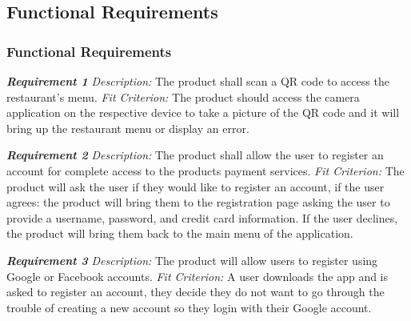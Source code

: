 \documentclass[12pt, titlepage]{article}
\begin{document}
\subsection{Functional Requirements}
\subsubsection{Functional Requirements}

\textbf{\textit{Requirement 1}}\newline
\textit{Description:}\newline
The product shall scan a QR code to access the restaurant's menu.\newline\newline
\textit{Fit Criterion:}\newline 
The product should access the camera application on the respective device to take a picture of the QR code and it will bring up the restaurant menu or display an error.
\newline

\noindent\textbf{\textit{Requirement 2}}\newline
\textit{Description:}\newline
The product shall allow the user to register an account for complete access to the products payment services. \newline\newline
\textit{Fit Criterion:}\newline 
The product will ask the user if they would like to register an account, if the user agrees: the product will bring them to the registration page asking the user to provide a username, password, and credit card information. If the user declines, the product will bring them back to the main menu of the application.
\newline

\noindent\textbf{\textit{Requirement 3}}\newline
\textit{Description:}\newline
The product will allow users to register using Google or Facebook accounts. \newline\newline
\textit{Fit Criterion:}\newline 
A user downloads the app and is asked to register an account, they decide they do not want to go through the trouble of creating a new account so they login with their Google account.
\newline
\end{document}
